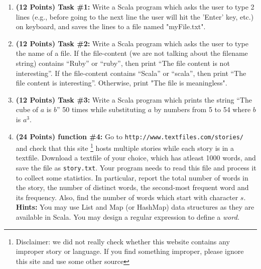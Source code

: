 \documentclass[paper=letter, fontsize=11pt]{scrartcl} %
\begin{document}
      \begin{enumerate}

        \item \textbf{(12 Points) Task \#1:} Write a Scala program 
which asks the user to type 2 lines (e.g., before going to the
next line the user will hit the 'Enter' key, etc.) on keyboard, 
and saves the lines to a file named "myFile.txt".

        \item \textbf{(12 Points) Task \#2:} Write a Scala program which asks 
the user to type the name of a file.
If the file-content (we are not talking about the filename string)
contains ``Ruby'' or ``ruby'', then print ``The file content is not interesting''. 
If the file-content contains ``Scala'' or ``scala'',
then print ``The file content is interesting''. Otherwise, print "The file is meaningless".

        \item \textbf{(12 Points) Task \#3:} Write a Scala program which 
prints the string ``The cube of $a$ is $b$'' 50 times 
while substituting $a$ by numbers from 5 to 54 where $b$ is $a^3$.


 \item \textbf{(24 Points) function \#4:} Go to \texttt{http://www.textfiles.com/stories/} and check that this site
\footnote {Disclaimer: we did not really check whether this website contains any improper story or language.
If you find something improper, please ignore this site and use some other source} hosts multiple stories
while each story is in a textfile. Download a textfile of your choice, which has atleast 1000 words,
and save the file as \texttt{story.txt}. Your program needs to read this file and process it to
collect some statistics. In particular, report the total number of words in the story,
the number of distinct words,
the second-most frequent word and its frequency. Also, find the number of words which start with character $s$. 
\textbf {Hints:} You may use List and Map (or HashMap) data structures as they are available in Scala. You may design a regular expression to define a \em{word}.




    \end{enumerate}
\end{document}

